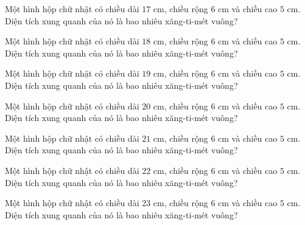 \begin{ex}
  Một hình hộp chữ nhật có chiều dài $17\text{ cm}$, chiều rộng $6\text{ cm}$ và chiều cao $5\text{ cm}$. Diện tích xung quanh của nó là bao nhiêu xăng-ti-mét vuông?
\end{ex}

\begin{ex}
  Một hình hộp chữ nhật có chiều dài $18\text{ cm}$, chiều rộng $6\text{ cm}$ và chiều cao $5\text{ cm}$. Diện tích xung quanh của nó là bao nhiêu xăng-ti-mét vuông?
\end{ex}

\begin{ex}
  Một hình hộp chữ nhật có chiều dài $19\text{ cm}$, chiều rộng $6\text{ cm}$ và chiều cao $5\text{ cm}$. Diện tích xung quanh của nó là bao nhiêu xăng-ti-mét vuông?
\end{ex}

\begin{ex}
  Một hình hộp chữ nhật có chiều dài $20\text{ cm}$, chiều rộng $6\text{ cm}$ và chiều cao $5\text{ cm}$. Diện tích xung quanh của nó là bao nhiêu xăng-ti-mét vuông?
\end{ex}

\begin{ex}
  Một hình hộp chữ nhật có chiều dài $21\text{ cm}$, chiều rộng $6\text{ cm}$ và chiều cao $5\text{ cm}$. Diện tích xung quanh của nó là bao nhiêu xăng-ti-mét vuông?
\end{ex}

\begin{ex}
  Một hình hộp chữ nhật có chiều dài $22\text{ cm}$, chiều rộng $6\text{ cm}$ và chiều cao $5\text{ cm}$. Diện tích xung quanh của nó là bao nhiêu xăng-ti-mét vuông?
\end{ex}

\begin{ex}
  Một hình hộp chữ nhật có chiều dài $23\text{ cm}$, chiều rộng $6\text{ cm}$ và chiều cao $5\text{ cm}$. Diện tích xung quanh của nó là bao nhiêu xăng-ti-mét vuông?
\end{ex}

